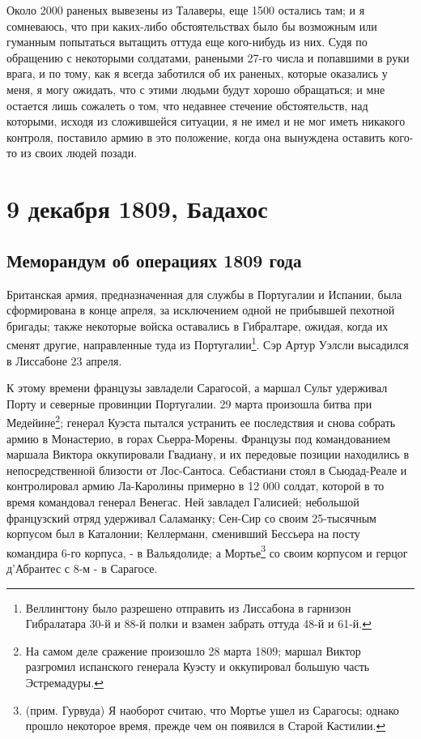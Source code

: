 \documentclass[
  oneside,
  12pt,
  titlepage]{book}
\begin{document}
Около 2000 раненых вывезены из Талаверы, еще 1500 остались там; и я сомневаюсь, что при каких-либо обстоятельствах было бы возможным или гуманным попытаться вытащить оттуда еще кого-нибудь из них. Судя по обращению с некоторыми солдатами, ранеными 27-го числа и попавшими в руки врага, и по тому, как я всегда заботился об их раненых, которые оказались у меня, я могу ожидать, что с этими людьми будут хорошо обращаться; и мне остается лишь сожалеть о том, что недавнее стечение обстоятельств, над которыми, исходя из сложившейся ситуации, я не имел и не мог иметь никакого контроля, поставило армию в это положение, когда она вынуждена оставить кого-то из своих людей позади.

\hypertarget{part-9-ux434ux435ux43aux430ux431ux440ux44f-1809-ux431ux430ux434ux430ux445ux43eux441}{%
\part*{9 декабря 1809, Бадахос}\label{part-9-ux434ux435ux43aux430ux431ux440ux44f-1809-ux431ux430ux434ux430ux445ux43eux441}}

\hypertarget{ux43cux435ux43cux43eux440ux430ux43dux434ux443ux43c-ux43eux431-ux43eux43fux435ux440ux430ux446ux438ux44fux445-1809-ux433ux43eux434ux430}{%
\chapter{Меморандум об операциях 1809 года}\label{ux43cux435ux43cux43eux440ux430ux43dux434ux443ux43c-ux43eux431-ux43eux43fux435ux440ux430ux446ux438ux44fux445-1809-ux433ux43eux434ux430}}

Британская армия, предназначенная для службы в Португалии и Испании, была сформирована в конце апреля, за исключением одной не прибывшей пехотной бригады; также некоторые войска оставались в Гибралтаре, ожидая, когда их сменят другие, направленные туда из Португалии\footnote{Веллингтону было разрешено отправить из Лиссабона в гарнизон Гибралатара 30-й и 88-й полки и взамен забрать оттуда 48-й и 61-й.}. Сэр Артур Уэлсли высадился в Лиссабоне 23 апреля.

К этому времени французы завладели Сарагосой, а маршал Сульт удерживал Порту и северные провинции Португалии. 29 марта произошла битва при Медейине\footnote{На самом деле сражение произошло 28 марта 1809; маршал Виктор разгромил испанского генерала Куэсту и оккупировал большую часть Эстремадуры.}; генерал Куэста пытался устранить ее последствия и снова собрать армию в Монастерио, в горах Сьерра-Морены. Французы под командованием маршала Виктора оккупировали Гвадиану, и их передовые позиции находились в непосредственной близости от Лос-Сантоса. Себастиани стоял в Сьюдад-Реале и контролировал армию Ла-Каролины примерно в 12 000 солдат, которой в то время командовал генерал Венегас. Ней завладел Галисией; небольшой французский отряд удерживал Саламанку; Сен-Сир со своим 25-тысячным корпусом был в Каталонии; Келлерманн, сменивший Бессьера на посту командира 6-го корпуса, - в Вальядолиде; а Мортье\footnote{(прим. Гурвуда) Я наоборот считаю, что Мортье ушел из Сарагосы; однако прошло некоторое время, прежде чем он появился в Старой Кастилии.} со своим корпусом и герцог д'Абрантес с 8-м - в Сарагосе.
\end{document}
